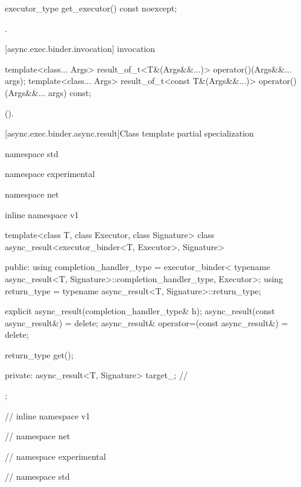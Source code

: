 %
\begin{itemdecl}
executor_type get_executor() const noexcept;
\end{itemdecl}

\begin{itemdescr}
\pnum
\returns {}.
\end{itemdescr}



[async.exec.binder.invocation]{ invocation}

%
\begin{itemdecl}
template<class... Args>
  result_of_t<T&(Args&&...)> operator()(Args&&... args);
template<class... Args>
  result_of_t<const T&(Args&&...)> operator()(Args&&... args) const;
\end{itemdecl}

\begin{itemdescr}
\pnum
\returns {} ().
\end{itemdescr}



[async.exec.binder.async.result]{Class template partial specialization }

%
%
\begin{codeblock}
namespace std {
namespace experimental {
namespace net {
inline namespace v1 {

  template<class T, class Executor, class Signature>
  class async_result<executor_binder<T, Executor>, Signature>
  {
  public:
    using completion_handler_type = executor_binder<
      typename async_result<T, Signature>::completion_handler_type,
        Executor>;
    using return_type = typename async_result<T, Signature>::return_type;

    explicit async_result(completion_handler_type& h);
    async_result(const async_result&) = delete;
    async_result& operator=(const async_result&) = delete;

    return_type get();

  private:
    async_result<T, Signature> target_; // \expos
  };

} // inline namespace v1
} // namespace net
} // namespace experimental
} // namespace std
\end{codeblock}

